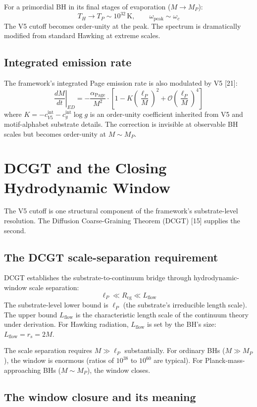 \documentclass[11pt,a4paper]{article}
\begin{document}
For a primordial BH in its final stages of evaporation ($M \to M_P$):
\[
T_H \to T_P \sim 10^{32}\, \mathrm{K}, \qquad \omega_\mathrm{peak} \sim \omega_c
\]
The V5 cutoff becomes order-unity at the peak. The spectrum is dramatically modified from standard Hawking at extreme scales.

\subsection{Integrated emission rate}

The framework's integrated Page emission rate is also modulated by V5 [21]:
\[
\left.\frac{dM}{dt}\right|_{ED} = -\frac{\alpha_\mathrm{Page}}{M^{2}} \cdot \left[1 - K\left(\frac{\ell_P}{M}\right)^{2} + \mathcal{O}\left(\frac{\ell_P}{M}\right)^{4}\right]
\]
where $K = -c_{V5}^\mathrm{int} - c_g^\mathrm{int}\log g$ is an order-unity coefficient inherited from V5 and motif-alphabet substrate details. The correction is invisible at observable BH scales but becomes order-unity at $M \sim M_P$.

\section{DCGT and the Closing Hydrodynamic Window}

The V5 cutoff is one structural component of the framework's substrate-level resolution. The Diffusion Coarse-Graining Theorem (DCGT) [15] supplies the second.

\subsection{The DCGT scale-separation requirement}

DCGT establishes the substrate-to-continuum bridge through hydrodynamic-window scale separation:
\[
\ell_P \ll R_\mathrm{cg} \ll L_\mathrm{flow}
\]
The substrate-level lower bound is $\ell_P$ (the substrate's irreducible length scale). The upper bound $L_\mathrm{flow}$ is the characteristic length scale of the continuum theory under derivation. For Hawking radiation, $L_\mathrm{flow}$ is set by the BH's size: $L_\mathrm{flow} = r_s = 2M$.

The scale separation requires $M \gg \ell_P$ substantially. For ordinary BHs ($M \gg M_P$), the window is enormous (ratios of $10^{38}$ to $10^{60}$ are typical). For Planck-mass-approaching BHs ($M \sim M_P$), the window closes.

\subsection{The window closure and its meaning}
\end{document}
